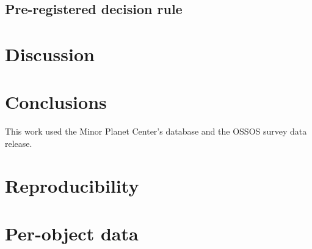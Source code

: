 \documentclass[twocolumn,linenumbers]{aastex631}
\begin{document}
\subsection{Pre-registered decision rule}\label{sec:prereg}

\section{Discussion}\label{sec:discussion}

\section{Conclusions}\label{sec:conclusions}

\begin{acknowledgments}
This work used the Minor Planet Center's database and the OSSOS survey data release.
\end{acknowledgments}


\appendix
\section{Reproducibility}\label{app:repro}
\section{Per-object data}\label{app:objects}

{}

\end{document}
